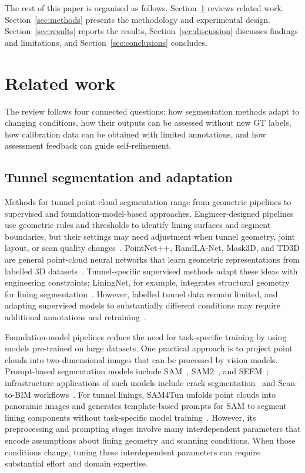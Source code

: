 \documentclass[a4paper,fleqn]{cas-dc}
\begin{document}
{The rest of this paper is organised as follows. Section~\ref{sec:related} reviews related work. Section~\ref{sec:methods} presents the methodology and experimental design. Section~\ref{sec:results} reports the results, Section~\ref{sec:discussion} discusses findings and limitations, and Section~\ref{sec:conclusions} concludes.




\section{Related work}
\label{sec:related}

The review follows four connected questions: how segmentation methods adapt to changing conditions, how their outputs can be assessed without new GT labels, how calibration data can be obtained with limited annotations, and how assessment feedback can guide self-refinement.

\subsection{Tunnel segmentation and adaptation}

Methods for tunnel point-cloud segmentation range from geometric pipelines to supervised and foundation-model-based approaches. Engineer-designed pipelines use geometric rules and thresholds to identify lining surfaces and segment boundaries, but their settings may need adjustment when tunnel geometry, joint layout, or scan quality changes~\cite{huang2021bim,weidner2024generalized,wang2025automated}. PointNet++, RandLA-Net, Mask3D, and TD3D are general point-cloud neural networks that learn geometric representations from labelled 3D datasets~\cite{qi2017pointnet,hu2020randla,schult2023mask3d,kolodiazhnyi2024td3d}. Tunnel-specific supervised methods adapt these ideas with engineering constraints; LiningNet, for example, integrates structural geometry for lining segmentation~\cite{lin2025liningnet}. However, labelled tunnel data remain limited, and adapting supervised models to substantially different conditions may require additional annotations and retraining~\cite{su2024review, cha2024deep}.

Foundation-model pipelines reduce the need for task-specific training by using models pre-trained on large datasets. One practical approach is to project point clouds into two-dimensional images that can be processed by vision models. Prompt-based segmentation models include SAM~\cite{kirillov2023sam}, SAM2~\cite{ravi2024sam2}, and SEEM~\cite{zou2023segment}; infrastructure applications of such models include crack segmentation~\cite{ge2024cracksam,ye2024sam} and Scan-to-BIM workflows~\cite{wang2024omni,pan2024zero,ye2026maintenance}. For tunnel linings, SAM4Tun unfolds point clouds into panoramic images and generates template-based prompts for SAM to segment lining components without task-specific model training~\cite{ye2025sam4tun}. However, its preprocessing and prompting stages involve many interdependent parameters that encode assumptions about lining geometry and scanning conditions. When those conditions change, tuning these interdependent parameters can require substantial effort and domain expertise.

}
\end{document}
